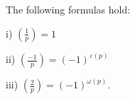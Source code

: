 The following formulas hold:

i) $\left(\frac{1}{p}\right) = 1$

ii) $\left(\frac{-1}{p}\right) = (-1)^{\varepsilon(p)}$

iii) $\left(\frac{2}{p}\right) = (-1)^{\omega(p)}$.
